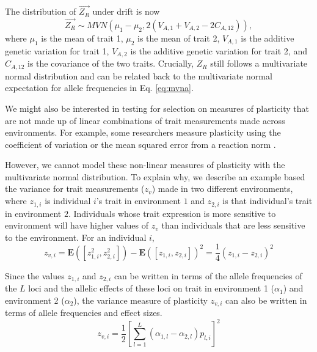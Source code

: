 \documentclass[11pt,letterpaper]{article}
\begin{document}
The distribution of $\vec{Z_{R}}$ under drift is now
\begin{equation}
\vec{Z_{R}} \sim MVN(\mu_{1} - \mu_{2}, 2(V_{A,1} + V_{A,2} - 2C_{A, 12})),
\end{equation}
where $\mu_{1}$ is the mean of trait 1, $\mu_{2}$ is the mean of trait 2, $V_{A,1}$ is the additive genetic variation for trait 1, $V_{A,2}$ is the additive genetic variation for trait 2, and $C_{A,12}$ is the covariance of the two traits.
Crucially, $Z_{R}$ still follows a multivariate normal distribution and can be related back to the multivariate normal expectation for allele frequencies in Eq. \ref{eq:mvna}.

We might also be interested in testing for selection on measures of plasticity that are not made up of linear combinations of trait measurements made across environments.
For example, some researchers measure plasticity using the coefficient of variation or the mean squared error from a reaction norm \citep{scheepens2018phenotypic, catlin2025structural}.

However, we cannot model these non-linear measures of plasticity with the multivariate normal distribution.
To explain why, we describe an example based the variance for trait measurements ($z_{v}$) made in two different environments, where $z_{1,i}$ is individual $i$'s trait in environment $1$ and $z_{2,i}$ is that individual's trait in environment $2$.
Individuals whose trait expression is more sensitive to environment will have higher values of $z_{v}$ than individuals that are less sensitive to the environment.
For an individual $i$,
\begin{equation}
  z_{v,i} = \textbf{E}([z_{1,i}^{2}, z_{2,i}^{2}]) - \textbf{E}([z_{1,i}, z_{2,i}])^{2}
 =\frac{1}{4}(z_{1,i} - z_{2,i})^2
    \end{equation}

Since the values $z_{1,i}$ and $z_{2,i}$ can be written in terms of the allele frequencies of the $L$ loci and the allelic effects of these loci on trait in environment 1 ($\alpha_{1}$) and environment 2 ($\alpha_{2}$), the variance measure of plasticity $z_{v,i}$ can also be written in terms of allele frequencies and effect sizes.
\begin{equation}\label{eq:zvi}
z_{v,i} = 
\frac{1}{2}[\sum^{L}_{l=1}(\alpha_{1,l}-\alpha_{2,l})p_{l,i}]^2
  \end{equation}
\end{document}
